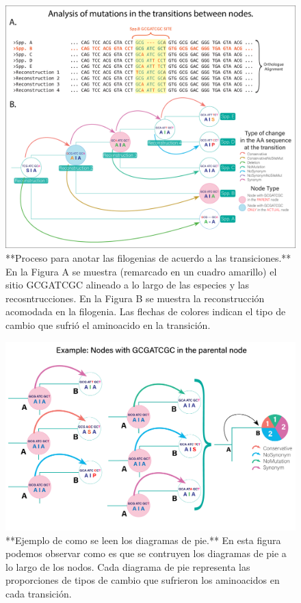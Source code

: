 \documentclass[
]{book}
\begin{document}
\begin{figure}

{\centering \includegraphics[width=1\linewidth]{Clados/Calothrix_B/figures/Reconstruction_explanation} 

}

\caption{**Proceso para anotar las filogenias de acuerdo a las transiciones.** En la Figura A se muestra (remarcado en un cuadro amarillo) el sitio GCGATCGC alineado a lo largo de las especies y las recosntrucciones. En la Figura B se muestra la reconstrucción acomodada en la filogenia. Las flechas de colores indican el tipo de cambio que sufrió el aminoacido en la transición.}\label{fig:FIG4}
\end{figure}

\begin{figure}

{\centering \includegraphics[width=1\linewidth]{Clados/Calothrix_B/figures/transition example} 

}

\caption{**Ejemplo de como se leen los diagramas de pie.** En esta figura podemos observar como es que se contruyen los diagramas de pie a lo largo de los nodos. Cada diagrama de pie representa las proporciones de tipos de cambio que sufrieron los aminoacidos en cada transición.}\label{fig:EXA}
\end{figure}
\end{document}

